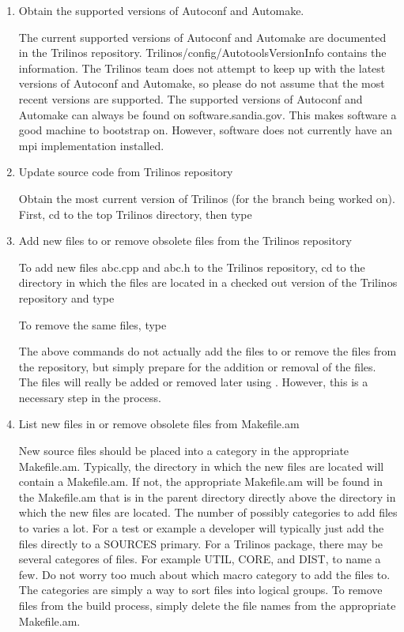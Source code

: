 \documentclass[12pt,relax]{TrilinosDevGuide}
\begin{document}
\begin{enumerate}
\item Obtain the supported versions of Autoconf and Automake.

The current supported versions of Autoconf and Automake are documented in 
the Trilinos repository.  Trilinos/config/AutotoolsVersionInfo contains the 
information.  The Trilinos team does not attempt to keep up with the latest 
versions of Autoconf and Automake, so please do not assume that the most 
recent versions are supported.  The supported versions of Autoconf and 
Automake can always be found on software.sandia.gov.  This makes software a 
good machine to bootstrap on.  However, software does not currently have an
mpi implementation installed.

\item Update source code from Trilinos repository

Obtain the most current version of Trilinos (for the branch being worked on).  
First, cd to the top Trilinos directory, then type


\item Add new files to or remove obsolete files from the Trilinos repository

To add new files abc.cpp and abc.h to the Trilinos repository, cd to the 
directory in which the files are located in a checked out version of the 
Trilinos repository and type


To remove the same files, type


The above commands do not actually add the files to or remove the files 
from the repository, but simply prepare for the addition or removal of the 
files.  The files will really be added or removed later using 
.  However, this is a necessary step in the process.

\item List new files in or remove obsolete files from Makefile.am

New source files should be placed into a category in the appropriate 
Makefile.am.  Typically, the directory in which the new files are located will 
contain a Makefile.am.  If not, the appropriate Makefile.am will be found in 
the Makefile.am that is in the parent directory directly above the directory 
in which the new files are located.  The number of possibly categories to add 
files to varies a lot.  For a test or example a developer will typically just 
add the files directly to a SOURCES primary.  For a Trilinos package, there 
may be several categores of files.  For example UTIL, CORE, and DIST, to name 
a few.  Do not worry too much about which macro category to add the files to.  
The categories are simply a way to sort files into logical groups.  To remove 
files from the build process, simply delete the file names from the 
appropriate Makefile.am.


\end{enumerate}
\end{document}
